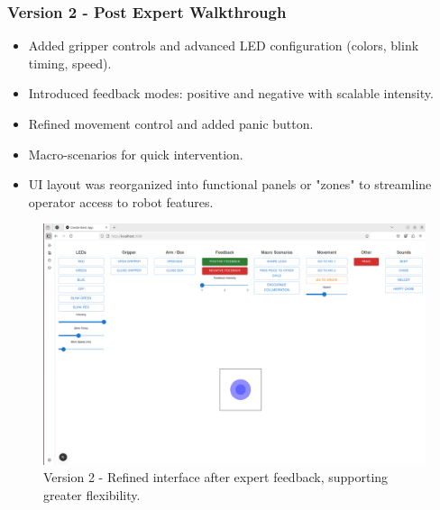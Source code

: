 \documentclass[a4paper]{usiinfbachelorproject}
\begin{document}
\subsubsection*{\textbf{Version 2 - Post Expert Walkthrough}}
\begin{itemize}
    \item Added gripper controls and advanced LED configuration (colors, blink timing, speed).
    \item Introduced feedback modes: positive and negative with scalable intensity.
    \item Refined movement control and added panic button.
    \item Macro-scenarios for quick intervention.
    \item UI layout was reorganized into functional panels or "zones" to streamline operator access to robot features.
\end{itemize}
\begin{figure}[H]
    \centering
    \includegraphics[width=0.8\linewidth]{figures/dashboard_v2.png}
    \caption{Version 2 - Refined interface after expert feedback, supporting greater flexibility.}
    \label{fig:dashboard-v2}
\end{figure}
\end{document}

